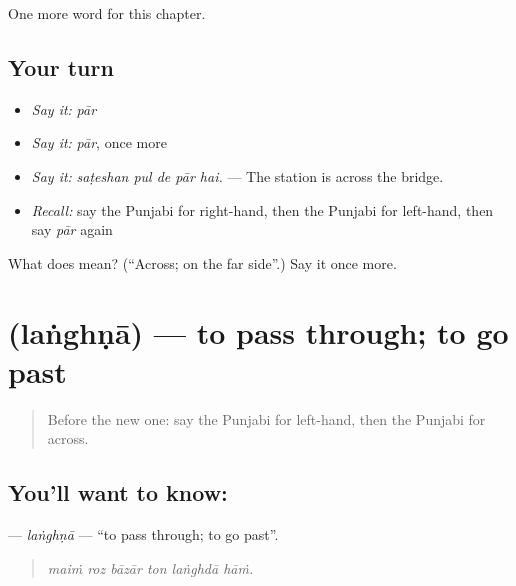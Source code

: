 \begin{grammarlens}[title={What you've built}]
One more word for this chapter.
\end{grammarlens}

\subsection*{Your turn}
\begin{itemize}
\raggedright
  \item \emph{Say it:} \emph{pār}
  \item \emph{Say it:} \emph{pār}, once more
  \item \emph{Say it:} \emph{saṭeshan pul de pār hai.} — The station is across the bridge.
  \item \emph{Recall:} say the Punjabi for right-hand, then the Punjabi for left-hand, then say \emph{pār} again
\end{itemize}

\begin{tcolorbox}[breakable,colback=teal!4,colframe=teal!35!black,title={Before you move on}]
What does  mean? (\textquotedblleft{}Across; on the far side\textquotedblright{}.) Say it once more.
\end{tcolorbox}
\section[\texorpdfstring{\pa{ਲੰਘਣਾ} (laṅghṇā)}{ਲੰਘਣਾ (laṅghṇā)}]{ (laṅghṇā) — to pass through; to go past}

\label{lesson:PA-C264-langhna}



\begin{quote}
Before the new one: say the Punjabi for left-hand, then the Punjabi for across.
\end{quote}

\subsection*{You'll want to know: }
\textbf{} — \emph{laṅghṇā} — \textquotedblleft{}to pass through; to go past\textquotedblright{}.

\begin{quote}
     
\end{quote}

\begin{quote}
\emph{maiṁ roz bāzār ton laṅghdā hāṁ.}
\end{quote}


